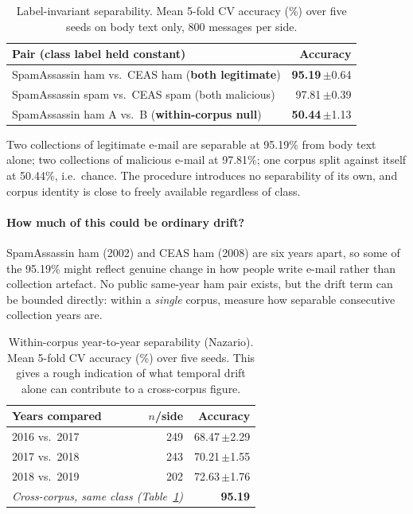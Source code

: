 \documentclass[twoside,11pt]{article}
\newcommand{\gd}[1]{\textbf{#1}}
\begin{document}
\begin{table}[t]
\centering\small
\caption{Label-invariant separability. Mean 5-fold CV accuracy (\%) over five
seeds on body text only, 800 messages per side.}
\label{tab:identity}
\begin{tabular}{lr}
\toprule
Pair (class label held constant) & Accuracy \\
\midrule
SpamAssassin ham vs.\ CEAS ham \quad(\gd{both legitimate}) & \gd{95.19}\,$\pm$0.64 \\
SpamAssassin spam vs.\ CEAS spam \quad(both malicious)     & 97.81\,$\pm$0.39 \\
\midrule
SpamAssassin ham A vs.\ B \quad(\gd{within-corpus null})   & \gd{50.44}\,$\pm$1.13 \\
\bottomrule
\end{tabular}
\end{table}

Two collections of legitimate e-mail are separable at 95.19\% from body text
alone; two collections of malicious e-mail at 97.81\%; one corpus split
against itself at 50.44\%, i.e.\ chance. The procedure introduces no
separability of its own, and corpus identity is close to freely available
regardless of class.

\paragraph{How much of this could be ordinary drift?}
SpamAssassin ham (2002) and CEAS ham (2008) are six years apart, so some of
the 95.19\% might reflect genuine change in how people write e-mail rather
than collection artefact. No public same-year ham pair exists, but the drift
term can be bounded directly: within a \emph{single} corpus, measure how
separable consecutive collection years are.

\begin{table}[t]
\centering\small
\caption{Within-corpus year-to-year separability (Nazario). Mean 5-fold CV
accuracy (\%) over five seeds. This gives a rough indication of what temporal
drift alone can contribute to a cross-corpus figure.}
\label{tab:drift}
\begin{tabular}{lrr}
\toprule
Years compared & $n$/side & Accuracy \\
\midrule
2016 vs.\ 2017 & 249 & 68.47\,$\pm$2.29 \\
2017 vs.\ 2018 & 243 & 70.21\,$\pm$1.55 \\
2018 vs.\ 2019 & 202 & 72.63\,$\pm$1.76 \\
\midrule
\multicolumn{2}{l}{\emph{Cross-corpus, same class (Table~\ref{tab:identity})}} & \gd{95.19} \\
\bottomrule
\end{tabular}
\end{table}
\end{document}
